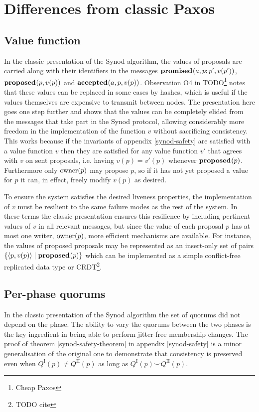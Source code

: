 \documentclass[journal]{IEEEtran}
\begin{document}
\section{Differences from classic Paxos} \label{deviations-from-classic}

\subsection{Value function}

In the classic presentation of the Synod algorithm, the values of proposals are
carried along with their identifiers in the messages $\mathbf{promised}_{}(a,p; p',v(p')
)$, $\mathbf{proposed}_{}( p,v(p))$ and $\mathbf{accepted}_{}(a, p,v(p) )$. Observation O4 in
TODO\footnote{Cheap Paxos} notes that these values can be replaced in some
cases by hashes, which is useful if the values themselves are expensive to
transmit between nodes. The presentation here goes one step further and shows
that the values can be completely elided from the messages that take part in
the Synod protocol, allowing considerably more freedom in the implementation of
the function $v$ without sacrificing consistency.  This works because if the
invariants of appendix \ref{synod-safety} are satisfied with a value function
$v$ then they are satisfied for any value function $v'$ that agrees with $v$ on
sent proposals, i.e. having $v(p) = v'(p)$ whenever $\mathbf{proposed}_{}(p)$.  Furthermore
only $\mathrm{owner}(p)$ may propose $p$, so if it has not yet proposed a value for $p$
it can, in effect, freely modify $v(p)$ as desired.

To ensure the system satisfies the desired liveness properties, the
implementation of $v$ must be resilient to the same failure modes as the rest
of the system. In these terms the classic presentation ensures this resilience
by including pertinent values of $v$ in all relevant messages, but since the
value of each proposal $p$ has at most one writer, $\mathrm{owner}(p)$, more efficient
mechanisms are available. For instance, the values of proposed proposals may be
represented as an insert-only set of pairs $\{ \langle p, v(p) \rangle \mid
\mathbf{proposed}_{}(p) \}$ which can be implemented as a simple conflict-free replicated
data type or CRDT\footnote{TODO cite}.

\subsection{Per-phase quorums}\label{per-phase-quorums}

In the classic presentation of the Synod algorithm the set of quorums did not
depend on the phase. The ability to vary the quorums between the two phases is
the key ingredient in being able to perform jitter-free membership changes. The
proof of theorem \ref{synod-safety-theorem} in appendix \ref{synod-safety} is a
minor generalisation of the original one to demonstrate that consistency is
preserved even when $Q^\textrm{I}(p) \ne Q^\textrm{II}(p)$ as long as
$Q^\textrm{I}(p) \smile Q^\textrm{II}(p)$.
\end{document}
